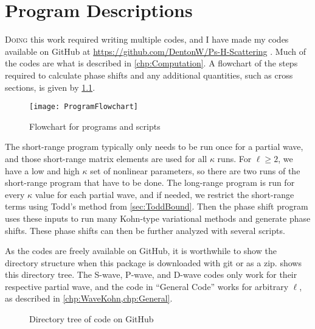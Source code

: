 \documentclass[Dissertation.tex]{subfiles}
\begin{document}
\chapter{Program Descriptions}
\label{chp:Programs}

\lettrine{\textcolor{startcolor}{D}}{oing} this work required writing multiple
codes, and I have made my codes available on GitHub at 
\url{https://github.com/DentonW/Ps-H-Scattering} \cite{GitHub}. Much of the
codes are what is described in \cref{chp:Computation}. A flowchart of the
steps required to calculate phase shifts and any additional quantities, such
as cross sections, is given by \cref{fig:ProgramFlowchart}.

\begin{figure}
	\centering
	\texttt{[image: ProgramFlowchart]}
	\caption{Flowchart for programs and scripts}
	\label{fig:ProgramFlowchart}
\end{figure}

The short-range program typically only needs to be run once for a partial wave,
and those short-range matrix elements are used for all $\kappa$ runs. For
$\ell \geq 2$, we have a low and high $\kappa$ set of nonlinear parameters, so
there are two runs of the short-range program that have to be done. The
long-range program is run for every $\kappa$ value for each partial wave, and
if needed, we restrict the short-range terms using Todd's method from
\cref{sec:ToddBound}. Then the phase shift program uses these inputs to run
many Kohn-type variational methods and generate phase shifts. These phase shifts
can then be further analyzed with several scripts.

As the codes are freely available on GitHub, it is worthwhile to show the
directory structure when this package is downloaded with git or as a zip.
 shows this directory tree. The S-wave, P-wave, and D-wave
codes only work for their respective partial wave, and the code in ``General 
Code'' works for arbitrary $\ell$, as described in \cref{chp:WaveKohn,chp:General}.

\begin{figure}[H]
\label{fig:directory}       
\caption{Directory tree of code on GitHub \cite{GitHub}}
\label{fig:dirtree}
\end{figure}
\end{document}

